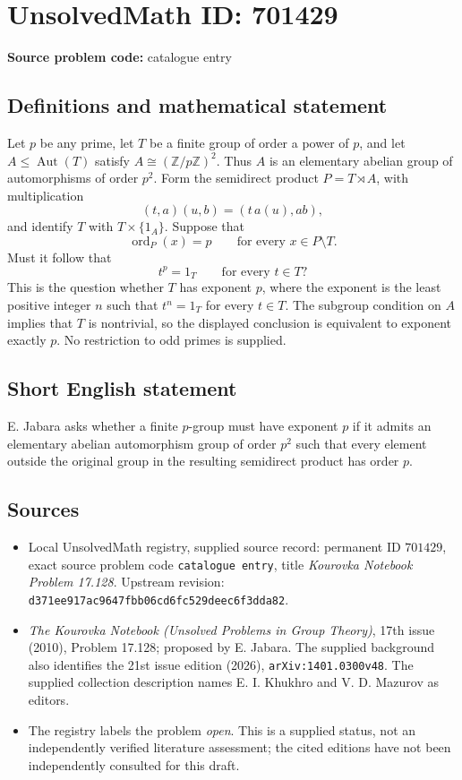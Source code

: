 \documentclass[11pt]{article}
\newcommand{\Z}{\mathbb{Z}}
\begin{document}
\section*{UnsolvedMath ID: 701429}
\textbf{Source problem code:} catalogue entry
\subsection{Definitions and mathematical statement}
Let \(p\) be any prime, let \(T\) be a finite group of order a power of \(p\), and let \(A\leq \operatorname{Aut}(T)\) satisfy \(A\cong (\Z/p\Z)^2\). Thus \(A\) is an elementary abelian group of automorphisms of order \(p^2\). Form the semidirect product \(P=T\rtimes A\), with multiplication
\[
(t,a)(u,b)=(t\,a(u),ab),
\]
and identify \(T\) with \(T\times\{1_A\}\). Suppose that
\[
\operatorname{ord}_P(x)=p\qquad\text{for every }x\in P\setminus T.
\]
Must it follow that
\[
t^p=1_T\qquad\text{for every }t\in T?
\]
This is the question whether \(T\) has exponent \(p\), where the exponent is the least positive integer \(n\) such that \(t^n=1_T\) for every \(t\in T\). The subgroup condition on \(A\) implies that \(T\) is nontrivial, so the displayed conclusion is equivalent to exponent exactly \(p\). No restriction to odd primes is supplied.
\subsection{Short English statement}
E. Jabara asks whether a finite \(p\)-group must have exponent \(p\) if it admits an elementary abelian automorphism group of order \(p^2\) such that every element outside the original group in the resulting semidirect product has order \(p\).
\subsection{Sources}
\begin{itemize}
\item Local UnsolvedMath registry, supplied source record: permanent ID \(701429\), exact source problem code \texttt{catalogue entry}, title \emph{Kourovka Notebook Problem 17.128}. Upstream revision: \texttt{d371ee917ac9647fbb06cd6fc529deec6f3dda82}.
\item \emph{The Kourovka Notebook (Unsolved Problems in Group Theory)}, 17th issue (2010), Problem 17.128; proposed by E. Jabara. The supplied background also identifies the 21st issue edition (2026), \texttt{arXiv:1401.0300v48}. The supplied collection description names E. I. Khukhro and V. D. Mazurov as editors.
\item The registry labels the problem \emph{open}. This is a supplied status, not an independently verified literature assessment; the cited editions have not been independently consulted for this draft.
\end{itemize}
\end{document}
